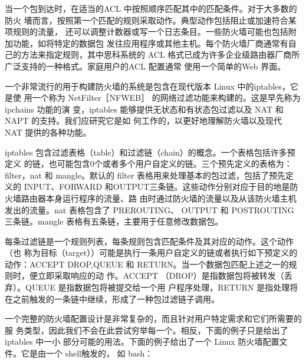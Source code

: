 当一个包到达时，在适当的ACL 中按照顺序匹配其中的匹配条件。对于大多数的防火
墻而言，按照第一个匹配的规则采取动作。典型动作包括阻止或加速符合某项规则的流量，
还可以调整计数器或写一个日志条目。一些防火墙可能也包括附加功能，如将特定的数据包
发往应用程序或其他主机。每个防火墙厂商通常有自己的方法来指定规则，其中思科系统的
ACL 格式已成为许多企业级路由器厂商所广泛支持的一种格式。家庭用户的ACL 配置通常
使用一个简单的Web 界面。

一个非常流行的用于构建防火墙的系统是包含在现代版本 Linux 中的iptables，它是使
用一个称为 NetFilter［NFWEB］ 的网络过滤功能来构建的。这是早先称为 ipchains 功能的演
变，iptables 能够提供无状态和有状态包过滤以及 NAT 和 NAPT 的支持。我们应研究它是如
何工作的，以更好地理解防火墙以及现代 NAT 提供的各种功能。

iptables 包含过滤表格（table）和过滤链（chain）的概念。一个表格包括许多预定义
的链，也可能包含0个或者多个用户自定义的链。三个预先定义的表格为：filter，nat 和
mangle。默认的 filter 表格用来处理基本的包过滤，包括了预先定义的 INPUT、FORWARD
和OUTPUT三条链。这些动作分别对应于目的地是防火墙路由器本身运行程序的流量、路
由时通过防火墙的流量以及从该防火墙主机发出的流量。nat 表格包含了 PREROUTING、
OUTPUT 和 POSTROUTING三条链。mangle 表格有五条链，主要用于任意修改数据包。

每条过滤链是一个规则列表，每条规则包含匹配条件及其对应的动作。这个动作（也
称为目标（target））可能是执行一条用户自定义的链或者执行如下预定义的动作：ACCEPT
DROP,QUEUE 和 RETURN。当一个数据包匹配上述之一的规则时，便立即采取响应的动
作。ACCEPT （DROP）是指数据包将被转发（丢弃）。QUEUE 是指数据包将被提交给一个用
户程序处理，RETURN 是指处理将在之前触发的一条链中继续，形成了一种包过滤链子调用。

一个完整的防火墙配置设计是非常复杂的，而且针对用户特定需求和它们所需要的服
务类型，因此我们不会在此尝试穷举每一个。相反，下面的例子只是给出了 iptables 中一小
部分可能的用法。下面的例子给出了一个 Linux 防火墙配置文件。它是由一个 shell触发的，
如 bash：

